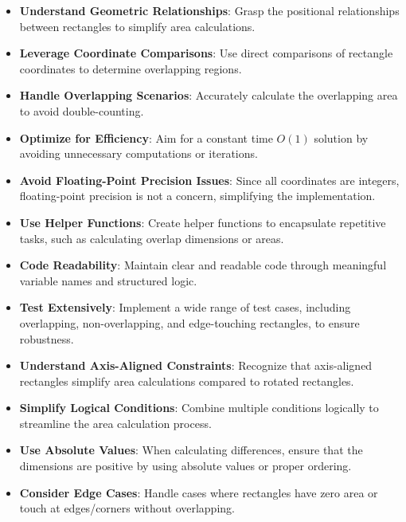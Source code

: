 \begin{itemize}
    \item \textbf{Understand Geometric Relationships}: Grasp the positional relationships between rectangles to simplify area calculations.
    
    \item \textbf{Leverage Coordinate Comparisons}: Use direct comparisons of rectangle coordinates to determine overlapping regions.
    
    \item \textbf{Handle Overlapping Scenarios}: Accurately calculate the overlapping area to avoid double-counting.
    
    \item \textbf{Optimize for Efficiency}: Aim for a constant time \(O(1)\) solution by avoiding unnecessary computations or iterations.
    
    \item \textbf{Avoid Floating-Point Precision Issues}: Since all coordinates are integers, floating-point precision is not a concern, simplifying the implementation.
    
    \item \textbf{Use Helper Functions}: Create helper functions to encapsulate repetitive tasks, such as calculating overlap dimensions or areas.
    
    \item \textbf{Code Readability}: Maintain clear and readable code through meaningful variable names and structured logic.
    
    \item \textbf{Test Extensively}: Implement a wide range of test cases, including overlapping, non-overlapping, and edge-touching rectangles, to ensure robustness.
    
    \item \textbf{Understand Axis-Aligned Constraints}: Recognize that axis-aligned rectangles simplify area calculations compared to rotated rectangles.
    
    \item \textbf{Simplify Logical Conditions}: Combine multiple conditions logically to streamline the area calculation process.
    
    \item \textbf{Use Absolute Values}: When calculating differences, ensure that the dimensions are positive by using absolute values or proper ordering.
    
    \item \textbf{Consider Edge Cases}: Handle cases where rectangles have zero area or touch at edges/corners without overlapping.
\end{itemize}

